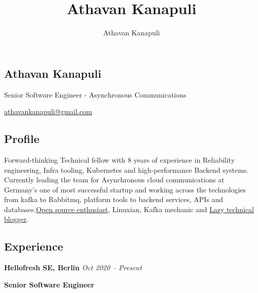\documentclass[11pt, oneside]{article}
\title{Athavan Kanapuli}
\author{Athavan Kanapuli}
\begin{document}
\begin{center}
\section*{Athavan Kanapuli}
Senior Software Engineer - Asynchronous Communications

\href{athavankanapuli@gmail.com}{athavankanapuli@gmail.com}
\end{center}

\subsection*{Profile}

Forward-thinking Technical fellow with 8 years of experience in Reliability engineering, Infra tooling, Kubernetes and high-performance Backend systems. Currently leading the team for Asynchronous cloud communications at Germany's one of most successful startup and working across the technologies from kafka to Rabbitmq, platform tools to backend services, APIs and databases.\href{https://github.com/kanapuli}{Open source enthusiast}, Linuxian, Kafka mechanic and \href{https://medium.com/@athavankanapuli}{Lazy technical blogger}.

\medskip
\subsection*{Experience}

\textbf{Hellofresh SE, Berlin}
\hfill
\textit{Oct 2020 – Present}

\textbf{Senior Software Engineer}
\end{document}
